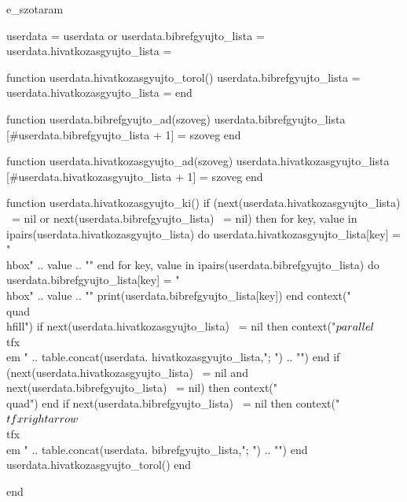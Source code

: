 \startenvironment e_szotaram

\startluacode

  userdata = userdata or {}
  userdata.bibrefgyujto_lista = {}
  userdata.hivatkozasgyujto_lista = {}

  function userdata.hivatkozasgyujto_torol()
    userdata.bibrefgyujto_lista = {}
    userdata.hivatkozasgyujto_lista = {}
  end

  function userdata.bibrefgyujto_ad(szoveg)
    userdata.bibrefgyujto_lista [#userdata.bibrefgyujto_lista + 1] = szoveg
  end

  function userdata.hivatkozasgyujto_ad(szoveg)
    userdata.hivatkozasgyujto_lista [#userdata.hivatkozasgyujto_lista + 1] = szoveg
  end

  function userdata.hivatkozasgyujto_ki()
    if (next(userdata.hivatkozasgyujto_lista) ~= nil or next(userdata.bibrefgyujto_lista) ~= nil) then
      for key, value in ipairs(userdata.hivatkozasgyujto_lista) do
        userdata.hivatkozasgyujto_lista[key] = "\\hbox{" .. value .. "}"
      end
      for key, value in ipairs(userdata.bibrefgyujto_lista) do
        userdata.bibrefgyujto_lista[key] = "\\hbox{" .. value .. "}"
        print(userdata.bibrefgyujto_lista[key])
      end
      context("\\quad\\hfill")
      if next(userdata.hivatkozasgyujto_lista) ~= nil then
        context("$\\parallel$~{\\tfx\\em " .. table.concat(userdata.  hivatkozasgyujto_lista,"; ") .. "}")
      end
      if (next(userdata.hivatkozasgyujto_lista) ~= nil and next(userdata.bibrefgyujto_lista) ~= nil) then
        context("\\quad")
      end
      if next(userdata.bibrefgyujto_lista) ~= nil then
        context("$\\tfx\\rightarrow$~{\\tfx\\em " .. table.concat(userdata.  bibrefgyujto_lista,"; ") .. "}")
      end
      userdata.hivatkozasgyujto_torol()
    end

  end

\stopluacode




